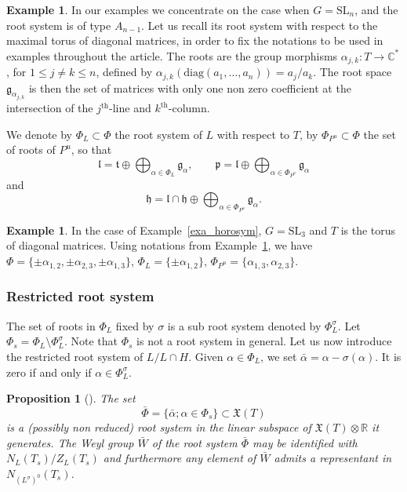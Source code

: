 \documentclass{amsart}
\newtheorem{prop}[thm]{Proposition}
\theoremstyle{definition}
\newtheorem{exa}[thm]{Example}
\begin{document}
\begin{exa}
\label{exa_roots_A}
In our examples we concentrate on the case when $G=\mathrm{SL}_n$, 
and the root system is of type $A_{n-1}$.
Let us recall its root system with respect to the maximal torus of diagonal 
matrices, in order to fix the notations to be used in examples 
throughout the article. 
The roots are the group morphisms $\alpha_{j,k}:T\rightarrow \mathbb{C}^*$, 
for $1\leq j\neq k\leq n$, defined by 
$\alpha_{j,k}(\mathrm{diag}(a_1,\ldots,a_n))=a_j/a_k$.
The root space $\mathfrak{g}_{\alpha_{j,k}}$ is then the set of matrices 
with only one non zero coefficient at the intersection of the 
$j^\mathrm{th}$-line and $k^{\mathrm{th}}$-column.
\end{exa}

We denote by $\Phi_L\subset \Phi$ the root system of $L$ with respect to  $T$, 
by $\Phi_{P^u}\subset \Phi$ the set of roots of $P^u$, so that  
\[
\mathfrak{l} = \mathfrak{t} \oplus \bigoplus_{\alpha \in \Phi_L} \mathfrak{g}_{\alpha},
\qquad 
\mathfrak{p}=\mathfrak{l}\oplus \bigoplus_{\alpha \in \Phi_{P^u}} \mathfrak{g}_{\alpha}
\]
and
\[
\mathfrak{h} = \mathfrak{l}\cap \mathfrak{h} \oplus \bigoplus_{\alpha\in \Phi_{P^u}} \mathfrak{g}_{\alpha}.
\]


\begin{exa}
\label{exa_horosym2}
In the case of Example~\ref{exa_horosym}, 
$G=\mathrm{SL}_3$ and $T$ is the torus of diagonal matrices. 
Using notations from Example~\ref{exa_roots_A}, we have 
$\Phi=\{\pm\alpha_{1,2},\pm\alpha_{2,3},\pm\alpha_{1,3}\}$, 
$\Phi_L=\{\pm\alpha_{1,2}\}$,
$\Phi_{P^u}=\{\alpha_{1,3},\alpha_{2,3}\}$.
\end{exa}

\subsubsection{Restricted root system}

The set of roots in $\Phi_L$ fixed by $\sigma$ is a sub root system denoted by 
$\Phi_L^{\sigma}$.
Let 
$\Phi_s = \Phi_L \setminus \Phi_L^{\sigma}$. Note that $\Phi_s$ is not a root system 
in general.
Let us now introduce the restricted root system of $L/L\cap H$. 
Given $\alpha \in \Phi_L$, we set $\bar{\alpha}=\alpha-\sigma(\alpha)$. 
It is zero if and only if $\alpha\in \Phi_L^{\sigma}$.

\begin{prop}[{\cite[Section~4]{Ric82}}] 
\label{prop_restricted_root_system}
The set 
\[
\bar{\Phi}= \{\bar{\alpha} ; \alpha \in \Phi_s \} \subset \mathfrak{X}(T)
\]
is a (possibly non reduced) root system in the linear subspace of 
$\mathfrak{X}(T) \otimes \mathbb{R}$ it generates.
The Weyl group $\bar{W}$ of the root system $\bar{\Phi}$ may be identified 
with $N_L(T_s)/Z_L(T_s)$ and furthermore any element of $\bar{W}$ admits a 
representant in $N_{(L^{\sigma})^0}(T_s)$. 
\end{prop}
\end{document}
